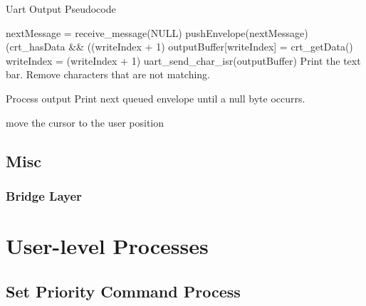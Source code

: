 \documentclass[12pt]{report}
\begin{document}
    \begin{algorithm}
        \caption{Uart Output Pseudocode}
        \label{code:uart_output}
        \begin{algorithmic}[1]
                \Loop
                    \State nextMessage = receive\_message(NULL)
                    \State pushEnvelope(nextMessage)
                    \While(crt\_hasData \&\& ((writeIndex + 1) %
                        \State outputBuffer[writeIndex] = crt\_getData()
                        \State writeIndex = (writeIndex + 1) %
                    \EndWhile
                    \State uart\_send\_char\_isr(outputBuffer)
                \EndLoop
            \EndFunction
                \State Print the text bar. Remove characters that are not matching.

                \State Process output
                    \State Print next queued envelope until a null byte occurrs.
                \EndWhile

                \State move the cursor to the user position
            \EndFunction
        \end{algorithmic}
    \end{algorithm}



\chapter{Misc}

\section{Bridge Layer}

\part{User-level Processes}

\chapter{Set Priority Command Process}
\end{document}
